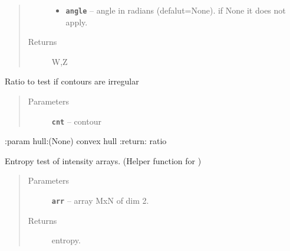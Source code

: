\documentclass[letterpaper,10pt,english]{sphinxmanual}
\begin{document}
\begin{fulllineitems}
\begin{quote}
\begin{description}
\begin{itemize}
\item {} 
\textbf{\texttt{angle}} -- angle in radians (defalut=None). if None it does not apply.

\end{itemize}

\item[{Returns}] \leavevmode
W,Z

\end{description}\end{quote}

\end{fulllineitems}


\begin{fulllineitems}
\label{RRtoolbox.lib.arrayops:RRtoolbox.lib.arrayops.basic.convexityRatio}
Ratio to test if contours are irregular
\begin{quote}\begin{description}
\item[{Parameters}] \leavevmode
\textbf{\texttt{cnt}} -- contour

\end{description}\end{quote}

:param hull:(None) convex hull
:return: ratio

\end{fulllineitems}


\begin{fulllineitems}
\label{RRtoolbox.lib.arrayops:RRtoolbox.lib.arrayops.basic.entroyTest}
Entropy test of intensity arrays. (Helper function for )
\begin{quote}\begin{description}
\item[{Parameters}] \leavevmode
\textbf{\texttt{arr}} -- array MxN of dim 2.

\item[{Returns}] \leavevmode
entropy.

\end{description}\end{quote}

\end{fulllineitems}
\end{document}
